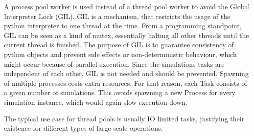 \documentclass[conference]{IEEEtran}
\begin{document}
A process pool worker is used instead of a thread pool worker to avoid the Global Interpreter Lock (GIL).
GIL is a mechanism, that restricts the usage of the python interpreter to one thread at the time.
From a programming standpoint, GIL can be seen as a kind of mutex, essentially halting all other threads until the current thread is finished.
The purpose of GIL is to guarantee consistency of python objects and prevent side effects or non-deterministic behaviour, which might occur because of parallel execution.
Since the simulations tasks are independent of each other, GIL is not needed and should be prevented.
Spawning of multiple processes costs extra resources.
For that reason, each Task consists of a given number of simulations.
This avoids spawning a new Process for every simulation instance, which would again slow execution down.


The typical use case for thread pools is usually IO limited tasks, justifying their existence for different types of large scale operations.\\\\
\end{document}

